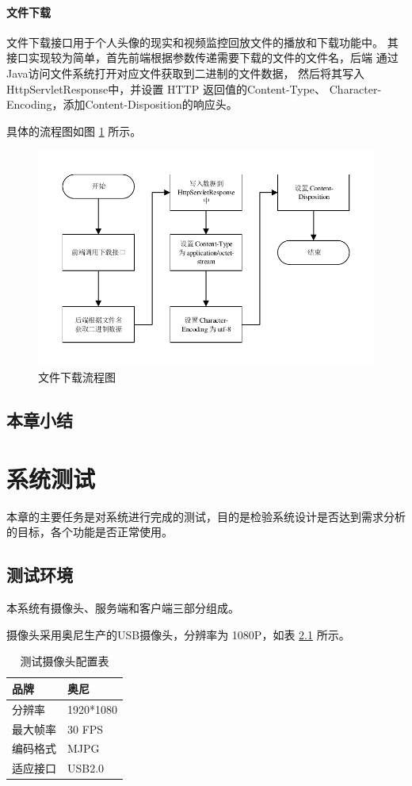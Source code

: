\subsubsection{文件下载}
文件下载接口用于个人头像的现实和视频监控回放文件的播放和下载功能中。
其接口实现较为简单，首先前端根据参数传递需要下载的文件的文件名，后端
通过Java访问文件系统打开对应文件获取到二进制的文件数据，
然后将其写入HttpServletResponse中，并设置 HTTP 返回值的Content-Type、
Character-Encoding，添加Content-Disposition的响应头。

具体的流程图如图 \ref{Fig:seq_download} 所示。

\begin{figure}[ht]
    \centering
    \includegraphics[width=0.7\linewidth]{./Figure/IMG_seq_download.pdf}
    \caption{文件下载流程图}\label{Fig:seq_download}
\end{figure}

\section{本章小结}

\chapter{系统测试}
本章的主要任务是对系统进行完成的测试，目的是检验系统设计是否达到需求分析的目标，各个功能是否正常使用。

\section{测试环境}
本系统有摄像头、服务端和客户端三部分组成。

摄像头采用奥尼生产的USB摄像头，分辨率为 1080P，如表 \ref{Tab:cam} 所示。
\begin{longtable}[ht]{|l|l|}
    \caption{测试摄像头配置表}
    \label{Tab:cam}\\
    \hline
    品牌&奥尼\\
    \hline
    分辨率&1920*1080\\
    \hline
    最大帧率&30 FPS\\
    \hline
    编码格式&MJPG \\
    \hline
    适应接口&USB2.0\\
    \hline
    \end{longtable}

